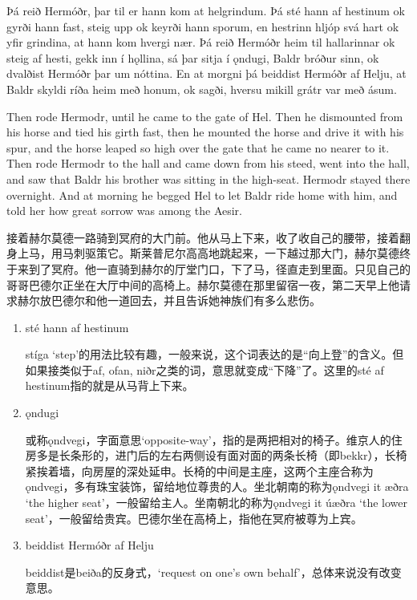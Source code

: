 \begin{paracol}{2}
    Þá reið Hermóðr, þar til er hann kom at helgrindum. Þá sté hann af hestinum ok gyrði hann fast, steig upp ok keyrði hann sporum, en hestrinn hljóp svá hart ok yfir grindina, at hann kom hvergi nær. Þá reið Hermóðr heim til hallarinnar ok steig af hesti, gekk inn í hǫllina, sá þar sitja í ǫndugi, Baldr bróður sinn, ok dvalðist Hermóðr þar um nóttina. En at morgni þá beiddist Hermóðr af Helju, at Baldr skyldi ríða heim með honum, ok sagði, hversu mikill grátr var með ásum.

    \switchcolumn

    Then rode Hermodr, until he came to the gate of Hel. Then he dismounted from his horse and tied his girth fast, then he mounted the horse and drive it with his spur, and the horse leaped so high over the gate that he came no nearer to it. Then rode Hermodr to the hall and came down from his steed, went into the hall, and saw that Baldr his brother was sitting in the high-seat. Hermodr stayed there overnight. And at morning he begged Hel to let Baldr ride home with him, and told her how great sorrow was among the Aesir.
\end{paracol}
\begin{translation*}{}
    接着赫尔莫德一路骑到冥府的大门前。他从马上下来，收了收自己的腰带，接着翻身上马，用马刺驱策它。斯莱普尼尔高高地跳起来，一下越过那大门，赫尔莫德终于来到了冥府。他一直骑到赫尔的厅堂门口，下了马，径直走到里面。只见自己的哥哥巴德尔正坐在大厅中间的高椅上。赫尔莫德在那里留宿一夜，第二天早上他请求赫尔放巴德尔和他一道回去，并且告诉她神族们有多么悲伤。
\end{translation*}
\begin{grammar*}{}
    \begin{enumerate}[leftmargin=*]
        \item sté hann af hestinum

              stíga `step'的用法比较有趣，一般来说，这个词表达的是“向上登”的含义。但如果接类似于af, ofan, niðr之类的词，意思就变成“下降”了。这里的sté af hestinum指的就是从马背上下来。

        \item ǫndugi

              或称ǫndvegi，字面意思`opposite-way'，指的是两把相对的椅子。维京人的住房多是长条形的，进门后的左右两侧设有面对面的两条长椅（即bekkr），长椅紧挨着墙，向房屋的深处延申。长椅的中间是主座，这两个主座合称为ǫndvegi，多有珠宝装饰，留给地位尊贵的人。坐北朝南的称为ǫndvegi it æðra `the higher seat'，一般留给主人。坐南朝北的称为ǫndvegi it úæðra `the lower seat'，一般留给贵宾。巴德尔坐在高椅上，指他在冥府被尊为上宾。

        \item beiddist Hermóðr af Helju

              beiddist是beiða的反身式，`request on one's own behalf'，总体来说没有改变意思。
    \end{enumerate}
\end{grammar*}
